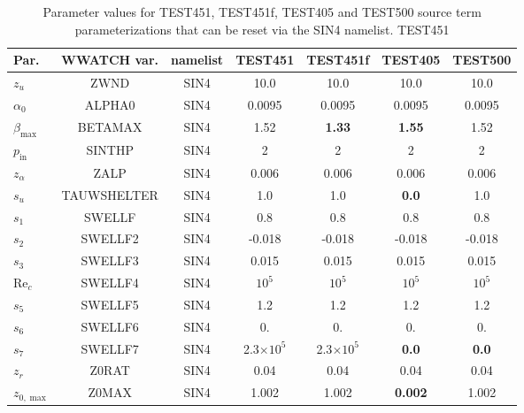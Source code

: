 \begin{table} \begin{center} {\tiny
\begin{tabular}{|l|c|c|c|c|c|c|} \hline \hline
Par.         &  WWATCH var.       & namelist & TEST451 & TEST451f & TEST405  & TEST500 \\
\hline
  $z_u$ &  ZWND                       & SIN4 & 10.0    & 10.0    & 10.0      & 10.0 \\
  $\alpha_0$ &  ALPHA0                & SIN4 & 0.0095  & 0.0095   & 0.0095    &  0.0095 \\
  $\beta_{\mathrm{max}}$ & BETAMAX    & SIN4 & 1.52    &\textbf{1.33}& \textbf{1.55}    &  1.52   \\
  $p_{\mathrm{in}}$ &  SINTHP         & SIN4 & 2       & 2       & 2         &  2      \\
  $z_\alpha$ &  ZALP                  & SIN4 & 0.006   & 0.006   & 0.006     &  0.006 \\
  $s_u$ &  TAUWSHELTER                & SIN4 & 1.0     & 1.0     & \textbf{0.0} & 1.0   \\
  $s_1$ &  SWELLF                     & SIN4 & 0.8     & 0.8     & 0.8       &  0.8 \\
  $s_2$ &  SWELLF2                    & SIN4 & -0.018  & -0.018  & -0.018    &  -0.018 \\
  $s_3$ &  SWELLF3                    & SIN4 &  0.015  &  0.015  &  0.015    &  0.015 \\
  $\mathrm{Re}_c$ &  SWELLF4                    & SIN4 & $10^5$  & $10^5$  & $10^5$    & $10^5$  \\
  $s_5$ &  SWELLF5                    & SIN4 & 1.2     & 1.2     & 1.2       &  1.2 \\
  $s_6$ &  SWELLF6                    & SIN4 & 0.      & 0.      & 0.        & 0.   \\
  $s_7$ &  SWELLF7                    & SIN4 & 2.3$\times 10^5$ & 2.3$\times 10^5$  &\textbf{0.0}       &\textbf{0.0} \\
  $z_r$ &  Z0RAT                      & SIN4 & 0.04    & 0.04    & 0.04      &  0.04 \\
  $z_{0,\max}$ &  Z0MAX               & SIN4 & 1.002   & 1.002   &\textbf{0.002}&  1.002 \\
\hline
\end{tabular} }
 \end{center}
\caption{Parameter values for TEST451, TEST451f, TEST405 and TEST500 source 
term parameterizations that can be reset via the SIN4 namelist. TEST451
}
\end{table}
